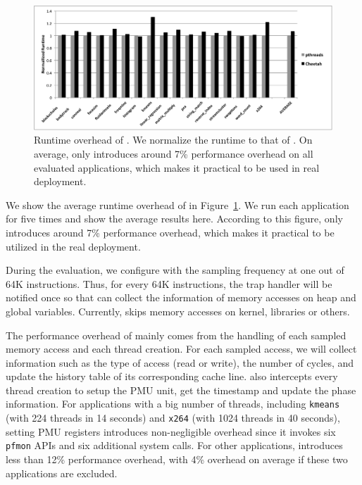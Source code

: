 \begin{figure}[htbp]
\centering
\includegraphics[width=2\columnwidth]{figure/Overhead.pdf}
\caption{Runtime overhead of \Cheetah{}. We normalize the runtime to that of \pthreads{}. On average, \cheetah{} only introduces around 7\% performance overhead on all evaluated applications, which makes it practical to be used in real deployment. \label{fig:overhead}}
\end{figure}

We show the average runtime overhead of \cheetah{} in Figure~\ref{fig:overhead}. We run each application for five times and show the average results here. According to this figure, \cheetah{} only introduces around 7\% performance overhead, which makes it practical to be utilized in the real deployment. 

During the evaluation, we configure \cheetah{} with the sampling frequency at one out of 64K instructions. Thus, for every 64K instructions, the trap handler will be notified once so that \cheetah{} can collect the information of memory accesses on heap and global variables. Currently, \Cheetah{} skips memory accesses on kernel, libraries or others. 

The performance overhead of \cheetah{} mainly comes from the handling of each sampled memory access and each thread creation. For each sampled access, we will collect information such as the type of access (read or write), the number of cycles, and update  the history table of its corresponding cache line. \cheetah{} also intercepts every thread creation to setup the PMU unit, get the timestamp and update the phase information. For applications with a big number of threads, including \texttt{kmeans} (with 224 threads in 14 seconds) and \texttt{x264} (with 1024 threads in 40 seconds), setting PMU registers introduces non-negligible overhead since it invokes six \texttt{pfmon} APIs and six additional system calls. For other applications, \cheetah{} introduces less than 12\% performance overhead, with 4\% overhead on average if these two applications are excluded.  

